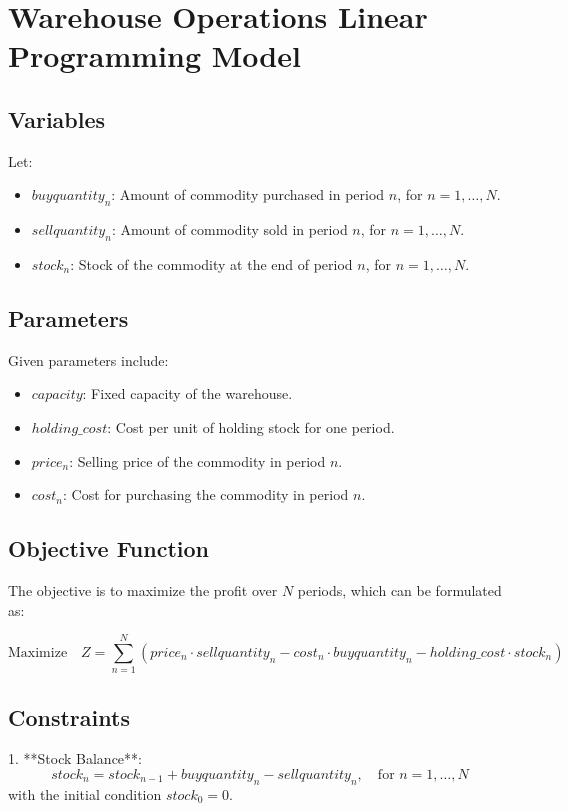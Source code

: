 \documentclass{article}
\begin{document}
\section*{Warehouse Operations Linear Programming Model}

\subsection*{Variables}
Let:
\begin{itemize}
    \item $buyquantity_n$: Amount of commodity purchased in period $n$, for $n = 1, \ldots, N$.
    \item $sellquantity_n$: Amount of commodity sold in period $n$, for $n = 1, \ldots, N$.
    \item $stock_n$: Stock of the commodity at the end of period $n$, for $n = 1, \ldots, N$.
\end{itemize}

\subsection*{Parameters}
Given parameters include:
\begin{itemize}
    \item $capacity$: Fixed capacity of the warehouse.
    \item $holding\_cost$: Cost per unit of holding stock for one period.
    \item $price_n$: Selling price of the commodity in period $n$.
    \item $cost_n$: Cost for purchasing the commodity in period $n$.
\end{itemize}

\subsection*{Objective Function}
The objective is to maximize the profit over $N$ periods, which can be formulated as:

\[
\text{Maximize} \quad Z = \sum_{n=1}^{N} \left( price_n \cdot sellquantity_n - cost_n \cdot buyquantity_n - holding\_cost \cdot stock_n \right)
\]

\subsection*{Constraints}

1. **Stock Balance**:
   \[
   stock_n = stock_{n-1} + buyquantity_n - sellquantity_n, \quad \text{for } n = 1, \ldots, N
   \]
   with the initial condition \( stock_0 = 0 \).
\end{document}

